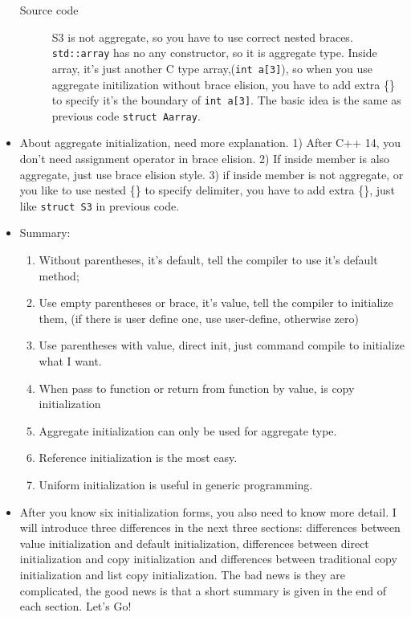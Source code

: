 \documentclass[a4paper,11pt,twoside]{book}
\begin{document}
\begin{itemize}
\begin{description}
		\item[Source code] S3 is not aggregate, so you have to use correct nested braces. \texttt{std::array} has no any constructor, so it is aggregate type. Inside array, it's just another C type array,(\texttt{int a[3]}), so when you use aggregate initilization without brace elision, you have to add extra \{\} to specify it's the boundary of \texttt{int a[3]}. The basic idea is the same as previous code \texttt{struct Aarray}.
\end{description}

    \item About aggregate initialization, need more explanation. 1) After C++ 14, you don't need assignment operator in brace elision. 2) If inside member is also aggregate, just use brace elision style. 3) if inside member is not aggregate, or you like to use nested \{\} to specify delimiter, you have to add extra \{\}, just like \texttt{struct S3} in previous code.

	\item Summary:
\begin{enumerate}
	\item Without parentheses, it's default, tell the compiler to use it's default method;
	\item Use empty parentheses or brace, it's value, tell the compiler to initialize them, (if there is user define one, use user-define, otherwise zero)
	\item Use parentheses with value, direct init, just command compile to initialize what I want.
	\item When pass to function or return from function by value, is copy initialization
	\item Aggregate initialization can only be used for aggregate type.
	\item Reference initialization is the most easy.
	\item Uniform initialization is useful in generic programming.
\end{enumerate}

\item After you know six initialization forms, you also need to know more detail. I will introduce three differences in the next three sections: differences between value initialization and default initialization, differences between direct initialization and copy initialization and differences between traditional copy initialization and list copy initialization. The bad news is they are complicated, the good news is that a short summary is given in the end of each section. Let's Go!
\end{itemize}
\end{document}
